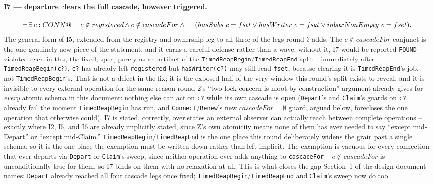 \documentclass[a4paper,10pt,fleqn]{article}
\begin{document}
\paragraph{I7 --- departure clears the full cascade, however triggered.}
\[
  \lnot\, \exists\, c : CONN @ \\
  \quad~ c \notin registered \land c \notin cascadeFor \land \\
  \quad~ (hasSubs~c = fset \lor hasWriter~c = fset \lor
    inboxNonEmpty~c = fset).
\]
The general form of I5, extended from the registry-and-ownership leg to
all three of the legs round 3 adds. The \texttt{$c \notin cascadeFor$}
conjunct is the one genuinely new piece of the statement, and it earns a
careful defense rather than a wave: without it, I7 would be reported
\texttt{FOUND}-violated even in this, the fixed, spec, purely as an
artifact of the \texttt{TimedReapBegin}/\texttt{TimedReapEnd} split --
immediately after \texttt{TimedReapBegin(c?)}, \texttt{c?} has already
left \texttt{registered} but \texttt{hasWriter(c?)} may still read
\texttt{fset}, because clearing it is \texttt{TimedReapEnd}'s job, not
\texttt{TimedReapBegin}'s. That is not a defect in the fix; it is the
exposed half of the very window this round's split exists to reveal, and
it is invisible to every external operation for the same reason round 2's
``two-lock concern is moot by construction'' argument already gives for
\emph{every} atomic schema in this document: nothing else can act on
\texttt{c?} while its own cascade is open (\texttt{Depart}'s and
\texttt{Claim}'s guards on \texttt{c?} already fail the moment
\texttt{TimedReapBegin} has run, and \texttt{Connect}/\texttt{Renew}'s new
\texttt{$cascadeFor = \emptyset$} guard, argued below, forecloses the one
operation that otherwise could). I7 is stated, correctly, over states an
external observer can actually reach between complete operations -- exactly
where I2, I5, and I6 are already implicitly stated, since Z's own
atomicity means none of them has ever needed to say ``except mid-Depart''
or ``except mid-Claim.'' \texttt{TimedReapBegin}/\texttt{TimedReapEnd} is
the one place this round deliberately widens the grain past a single
schema, so it is the one place the exemption must be written down rather
than left implicit. The exemption is vacuous for every connection that
ever departs via \texttt{Depart} or \texttt{Claim}'s sweep, since neither
operation ever adds anything to \texttt{cascadeFor} -- \texttt{$c
\notin cascadeFor$} is unconditionally true for them, so I7 binds on them
with no relaxation at all. This is what closes the gap Section~1 of the
design document names: \texttt{Depart} already reached all four cascade
legs once fixed; \texttt{TimedReapBegin}/\texttt{TimedReapEnd} and
\texttt{Claim}'s sweep now do too.
\end{document}

